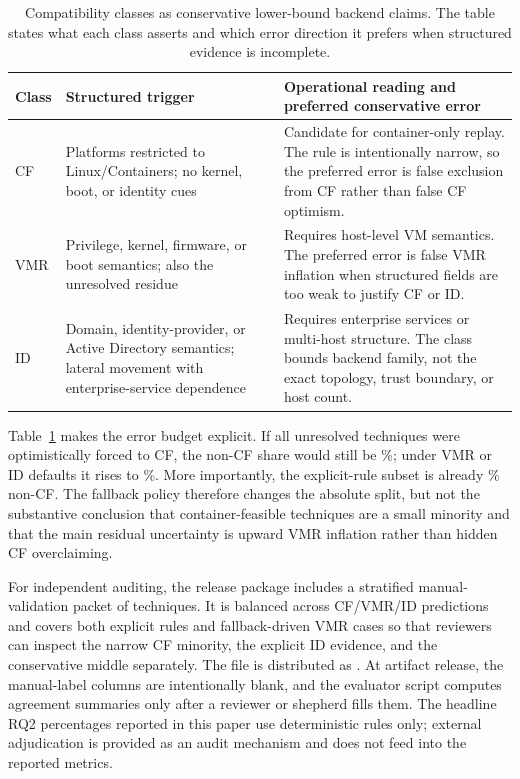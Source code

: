 \documentclass[sigconf]{acmart}
\begin{document}
\begin{table}[!tb]
\caption{Compatibility classes as conservative lower-bound backend claims. The table states what each class asserts and which error direction it prefers when structured evidence is incomplete.}\label{tab:compatibility_design}
\centering\footnotesize
\begin{tabular}{@{}>{\raggedright\arraybackslash}p{0.7cm}>{\raggedright\arraybackslash}p{2.1cm}>{\raggedright\arraybackslash}p{3.45cm}@{}}
\toprule
\textbf{Class} & \textbf{Structured trigger} & \textbf{Operational reading and preferred conservative error} \\
\midrule
CF & Platforms restricted to Linux/Containers; no kernel, boot, or identity cues & Candidate for container-only replay. The rule is intentionally narrow, so the preferred error is false exclusion from CF rather than false CF optimism. \\
VMR & Privilege, kernel, firmware, or boot semantics; also the unresolved residue & Requires host-level VM semantics. The preferred error is false VMR inflation when structured fields are too weak to justify CF or ID. \\
ID & Domain, identity-provider, or Active Directory semantics; lateral movement with enterprise-service dependence & Requires enterprise services or multi-host structure. The class bounds backend family, not the exact topology, trust boundary, or host count. \\
\bottomrule
\end{tabular}
\end{table}

Table~\ref{tab:compatibility_design} makes the error budget explicit. If all unresolved techniques were optimistically forced to CF, the non-CF share would still be \compatibilitynoncffloorpercentage\%; under VMR or ID defaults it rises to \compatibilitynoncfceilingpercentage\%. More importantly, the explicit-rule subset is already \compatibilitynoncfresolvedpercentage\% non-CF. The fallback policy therefore changes the absolute split, but not the substantive conclusion that container-feasible techniques are a small minority and that the main residual uncertainty is upward VMR inflation rather than hidden CF overclaiming.

For independent auditing, the release package includes a stratified manual-validation packet of \compatibilityvalidationsamplesize{} techniques. It is balanced across CF/VMR/ID predictions and covers both explicit rules and fallback-driven VMR cases so that reviewers can inspect the narrow CF minority, the explicit ID evidence, and the conservative middle separately. The file is distributed as . At artifact release, the manual-label columns are intentionally blank, and the evaluator script computes agreement summaries only after a reviewer or shepherd fills them. The headline RQ2 percentages reported in this paper use deterministic rules only; external adjudication is provided as an audit mechanism and does not feed into the reported metrics.
\end{document}
